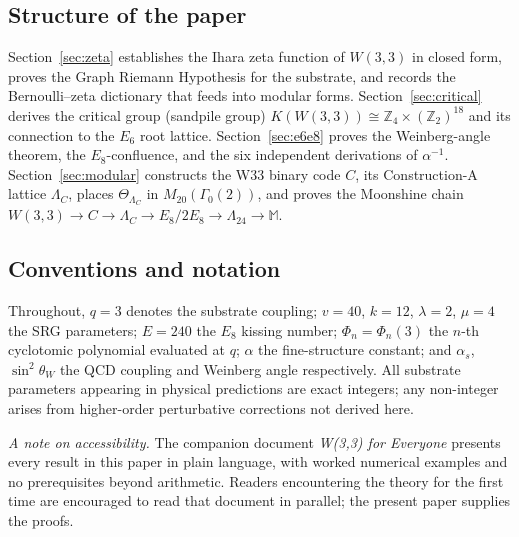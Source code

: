 \subsection*{Structure of the paper}

Section~\ref{sec:zeta} establishes the Ihara zeta function of $W(3,3)$
in closed form, proves the Graph Riemann Hypothesis for the substrate,
and records the Bernoulli--zeta dictionary that feeds into modular forms.
Section~\ref{sec:critical} derives the critical group (sandpile group)
$K(W(3,3)) \cong \mathbb{Z}_4 \times (\mathbb{Z}_{2})^{18}$
and its connection to the $E_6$ root lattice.
Section~\ref{sec:e6e8} proves the Weinberg-angle theorem,
the $E_8$-confluence, and the six independent derivations of $\alpha^{-1}$.
Section~\ref{sec:modular} constructs the W33 binary code $C$,
its Construction-A lattice $\Lambda_C$, places $\Theta_{\Lambda_C}$ in
$M_{20}(\Gamma_0(2))$, and proves the Moonshine chain
$W(3,3) \to C \to \Lambda_C \to E_8/2E_8 \to \Lambda_{24} \to \mathbb{M}$.

\subsection*{Conventions and notation}

Throughout, $q = 3$ denotes the substrate coupling; $v = 40$, $k = 12$,
$\lambda = 2$, $\mu = 4$ the SRG parameters; $E = 240$ the $E_8$ kissing number;
$\Phi_n = \Phi_n(3)$ the $n$-th cyclotomic polynomial evaluated at $q$;
$\alpha$ the fine-structure constant; and $\alpha_s$, $\sin^2\theta_W$ the
QCD coupling and Weinberg angle respectively.
All substrate parameters appearing in physical predictions are exact integers;
any non-integer arises from higher-order perturbative corrections not
derived here.

\medskip
\noindent\textit{A note on accessibility.}
The companion document \emph{W(3,3) for Everyone}\cite{W33ForEveryone}
presents every result in this paper in plain language, with worked numerical
examples and no prerequisites beyond arithmetic.
Readers encountering the theory for the first time are encouraged to read
that document in parallel; the present paper supplies the proofs.
